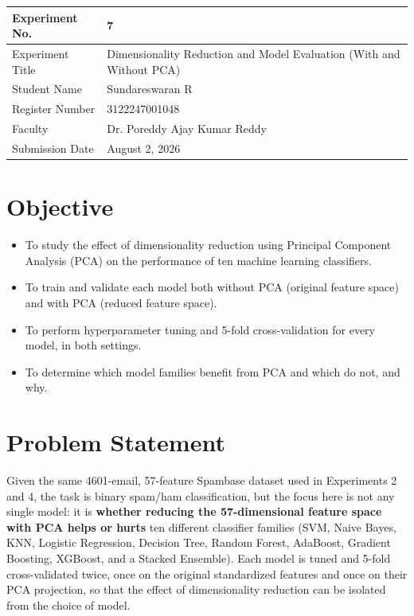\documentclass[12pt,a4paper]{article}
\begin{document}
\begin{tabular}{|p{4cm}|p{11cm}|}
\hline
Experiment No. & 7 \\ \hline
Experiment Title & Dimensionality Reduction and Model Evaluation (With and Without
PCA)\footnotemark\\ \hline
Student Name & Sundareswaran R \\ \hline
Register Number & 3122247001048 \\ \hline
Faculty & Dr. Poreddy Ajay Kumar Reddy \\ \hline
Submission Date & August 2, 2026 \\ \hline
\end{tabular}

\section{Objective}
\begin{itemize}[nosep]
\item To study the effect of dimensionality reduction using Principal Component Analysis
(PCA) on the performance of ten machine learning classifiers.
\item To train and validate each model both without PCA (original feature space) and with
PCA (reduced feature space).
\item To perform hyperparameter tuning and 5-fold cross-validation for every model, in both
settings.
\item To determine which model families benefit from PCA and which do not, and why.
\end{itemize}

\section{Problem Statement}
Given the same 4601-email, 57-feature Spambase dataset used in Experiments 2 and 4, the task
is binary spam/ham classification, but the focus here is not any single model: it is
\textbf{whether reducing the 57-dimensional feature space with PCA helps or hurts} ten
different classifier families (SVM, Naive Bayes, KNN, Logistic Regression, Decision Tree,
Random Forest, AdaBoost, Gradient Boosting, XGBoost, and a Stacked Ensemble). Each model is
tuned and 5-fold cross-validated twice, once on the original standardized features and once
on their PCA projection, so that the effect of dimensionality reduction can be isolated from
the choice of model.
\end{document}
